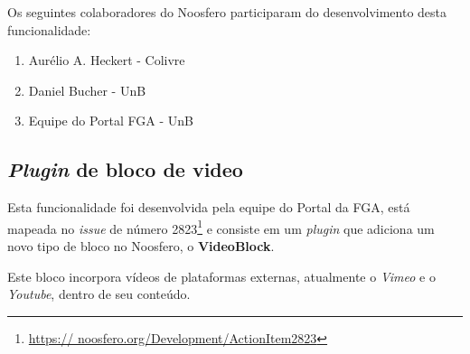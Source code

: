 Os seguintes colaboradores do Noosfero participaram do desenvolvimento desta
funcionalidade:

\begin{enumerate}

\item Aurélio A. Heckert - Colivre

\item Daniel Bucher - UnB

\item Equipe do Portal FGA - UnB

\end{enumerate}

\subsection{\textit{Plugin} de bloco de video}

Esta funcionalidade foi desenvolvida pela equipe do Portal
da FGA, está mapeada no \textit{issue} de número 2823\footnote{\url{https://
noosfero.org/Development/ActionItem2823}} e consiste em um \textit{plugin}
que adiciona um novo tipo de bloco no Noosfero, o \textbf{VideoBlock}.

Este bloco incorpora vídeos de plataformas externas, atualmente o \textit{Vimeo}
e o \textit{Youtube}, dentro de seu conteúdo.

